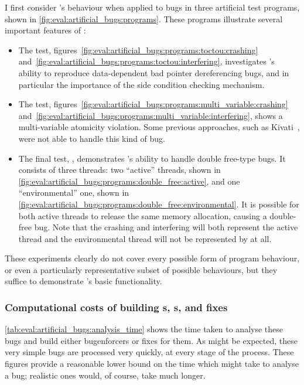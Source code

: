 \noindent
I first consider {\technique}'s behaviour when applied to bugs in
three artificial test programs, shown in
\autoref{fig:eval:artificial_bugs:programs}.  These programs
illustrate several important features of {\technique}:
\begin{itemize}
  \item The  test,
    figures~\ref{fig:eval:artificial_bugs:programs:toctou:crashing}
    and~\ref{fig:eval:artificial_bugs:programs:toctou:interfering},
    investigates {\technique}'s ability to reproduce data-dependent
    bad pointer dereferencing bugs, and in particular the importance
    of the side condition checking mechanism.
  \item The  test,
    figures~\ref{fig:eval:artificial_bugs:programs:multi_variable:crashing}
    and~\ref{fig:eval:artificial_bugs:programs:multi_variable:interfering},
    shows a multi-variable atomicity violation.  Some previous
    approaches, such as Kivati~\cite{Chew2010}, were not able to handle
    this kind of bug.
  \item The final test, , demonstrates
    {\technique}'s ability to handle double free-type bugs.  It
    consists of three threads: two ``active'' threads, shown in
    \autoref{fig:eval:artificial_bugs:programs:double_free:active},
    and one ``environmental'' one, shown in
    \autoref{fig:eval:artificial_bugs:programs:double_free:environmental}.
    It is possible for both active threads to release the same memory
    allocation, causing a double-free bug.  Note that the crashing and
    interfering {\StateMachines} will both represent the active thread
    and the environmental thread will not be represented by
    {\AStateMachine} at all.
\end{itemize}
These experiments clearly do not cover every possible form of program
behaviour, or even a particularly representative subset of possible
behaviours, but they suffice to demonstrate {\technique}'s basic
functionality.

\subsubsection{Computational costs of building s, s, and fixes}

\autoref{tab:eval:artificial_bugs:analysis_time} shows the time taken
to analyse these bugs and build either \glspl{bugenforcer} or fixes
for them.  As might be expected, these very simple bugs are processed
very quickly, at every stage of the process.  These figures provide a
reasonable lower bound on the time which {\technique} might take to
analyse a bug; realistic ones would, of course, take much longer.

